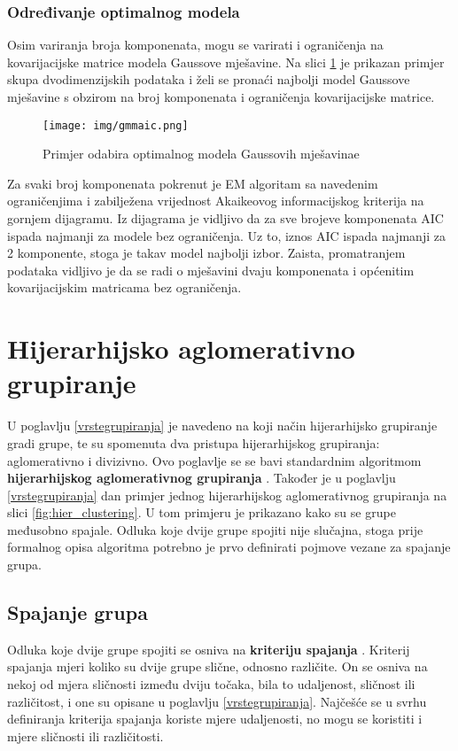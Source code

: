 \documentclass[times, utf8, zavrsni]{fer}
\begin{document}
\subsubsection{Određivanje optimalnog modela}
Osim variranja broja komponenata, mogu se varirati i ograničenja na kovarijacijske matrice modela Gaussove mješavine. Na slici \ref{fig:gmmaic} je prikazan primjer skupa dvodimenzijskih podataka i želi se pronaći najbolji model Gaussove mješavine s obzirom na broj komponenata i ograničenja kovarijacijske matrice.
\begin{figure}[H]
    \centering
    \texttt{[image: img/gmmaic.png]}
    \caption{Primjer odabira optimalnog modela Gaussovih mješavinae}
    \label{fig:gmmaic}
\end{figure}
Za svaki broj komponenata pokrenut je EM algoritam sa navedenim ograničenjima i zabilježena vrijednost Akaikeovog informacijskog kriterija na gornjem dijagramu. Iz dijagrama je vidljivo da za sve brojeve komponenata AIC ispada najmanji za modele bez ograničenja. Uz to, iznos AIC ispada najmanji za 2 komponente, stoga je takav model najbolji izbor. Zaista, promatranjem podataka vidljivo je da se radi o mješavini dvaju komponenata i općenitim kovarijacijskim matricama bez ograničenja. 

\section{Hijerarhijsko aglomerativno grupiranje}
U poglavlju \ref{vrstegrupiranja} je navedeno na koji način hijerarhijsko grupiranje gradi grupe, te su spomenuta dva pristupa hijerarhijskog grupiranja: aglomerativno i divizivno. Ovo poglavlje se se bavi standardnim algoritmom \textbf{hijerarhijskog aglomerativnog grupiranja} . Također je u poglavlju \ref{vrstegrupiranja} dan primjer jednog hijerarhijskog aglomerativnog grupiranja na slici \ref{fig:hier_clustering}. U tom primjeru je prikazano kako su se grupe međusobno spajale. Odluka koje dvije grupe spojiti nije slučajna, stoga prije formalnog opisa algoritma potrebno je prvo definirati pojmove vezane za spajanje grupa.

\subsection{Spajanje grupa}
Odluka koje dvije grupe spojiti se osniva na \textbf{kriteriju spajanja} . Kriterij spajanja mjeri koliko su dvije grupe slične, odnosno različite. On se osniva na nekoj od mjera sličnosti između dviju točaka, bila to udaljenost, sličnost ili različitost, i one su opisane u poglavlju \ref{vrstegrupiranja}. Najčešće se u svrhu definiranja kriterija spajanja koriste mjere udaljenosti, no mogu se koristiti i mjere sličnosti ili različitosti.
\end{document}
